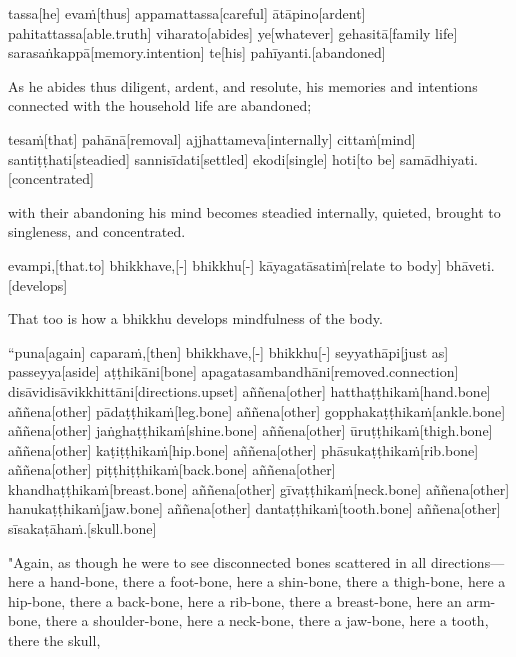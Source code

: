 \begin{samepage}
\begingl[glneveryline={\PaliGlossA,\PaliGlossB}]
tassa[he] evaṁ[thus] appamattassa[careful] ātāpino[ardent] pahitattassa[able.truth] viharato[abides] ye[whatever] gehasitā[family life] sarasaṅkappā[memory.intention] te[his] pahīyanti.[abandoned]
\endgl
\nopagebreak
\linespread{0.5}
\begin{spacin}{0.2}
{\PaliGlossFT As he abides thus diligent, ardent, and resolute, his memories and intentions connected with the household life are abandoned;}
\end{spacin}
\vskip 12pt
\end{samepage}
\begin{samepage}
\begingl[glneveryline={\PaliGlossA,\PaliGlossB}]
tesaṁ[that] pahānā[removal] ajjhattameva[internally] cittaṁ[mind] santiṭṭhati[steadied] sannisīdati[settled] ekodi[single] hoti[to be] samādhiyati.[concentrated]
\endgl
\nopagebreak
\linespread{0.5}
\begin{spacin}{0.2}
{\PaliGlossFT with their abandoning his mind becomes steadied internally, quieted, brought to singleness, and concentrated.}
\end{spacin}
\vskip 12pt
\end{samepage}
\begin{samepage}
\begingl[glneveryline={\PaliGlossA,\PaliGlossB}]
evampi,[that.to] bhikkhave,[-] bhikkhu[-] kāyagatāsatiṁ[relate to body] bhāveti.[develops]
\endgl
\nopagebreak
\linespread{0.5}
\begin{spacin}{0.2}
{\PaliGlossFT That too is how a bhikkhu develops mindfulness of the body.}
\end{spacin}
\vskip 12pt
\end{samepage}
\vskip 0.05in
\begin{samepage}
\begingl[glneveryline={\PaliGlossA,\PaliGlossB}]
“puna[again] caparaṁ,[then] bhikkhave,[-] bhikkhu[-] seyyathāpi[just as] passeyya[aside] aṭṭhikāni[bone] apagatasambandhāni[removed.connection] disāvidisāvikkhittāni[directions.upset] aññena[other] hatthaṭṭhikaṁ[hand.bone] aññena[other] pādaṭṭhikaṁ[leg.bone] aññena[other] gopphakaṭṭhikaṁ[ankle.bone] aññena[other] jaṅghaṭṭhikaṁ[shine.bone] aññena[other] ūruṭṭhikaṁ[thigh.bone] aññena[other] kaṭiṭṭhikaṁ[hip.bone] aññena[other] phāsukaṭṭhikaṁ[rib.bone] aññena[other] piṭṭhiṭṭhikaṁ[back.bone] aññena[other] khandhaṭṭhikaṁ[breast.bone] aññena[other] gīvaṭṭhikaṁ[neck.bone] aññena[other] hanukaṭṭhikaṁ[jaw.bone] aññena[other] dantaṭṭhikaṁ[tooth.bone] aññena[other] sīsakaṭāhaṁ.[skull.bone]
\endgl
\nopagebreak
\linespread{0.5}
\begin{spacin}{0.2}
{\PaliGlossFT "Again, as though he were to see disconnected bones scattered in all directions—here a hand-bone, there a foot-bone, here a shin-bone, there a thigh-bone, here a hip-bone, there a back-bone, here a rib-bone, there a breast-bone, here an arm-bone, there a shoulder-bone, here a neck-bone, there a jaw-bone, here a tooth, there the skull,}
\end{spacin}
\vskip 12pt
\end{samepage}
